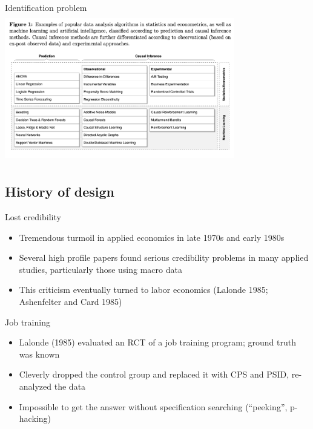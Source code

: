 \documentclass{beamer}
\begin{document}
\begin{frame}{Identification problem}
  \centering
  \includegraphics[scale=0.5,height=6.5cm, width=10cm]{./lecture_includes/prediction_causality.png}
\end{frame}



\subsection{History of design}



\begin{frame}{Lost credibility}

  \begin{itemize}
  \item Tremendous turmoil in applied economics in late 1970s and early 1980s
  \item Several high profile papers found serious credibility problems in many applied studies, particularly those using macro data
  \item This criticism eventually turned to labor economics (Lalonde 1985; Ashenfelter and Card 1985)
  \end{itemize}

\end{frame}


\begin{frame}{Job training}

\begin{itemize}
\item Lalonde (1985) evaluated an RCT of a job training program; ground truth was known
\item Cleverly dropped the control group and replaced it with CPS and PSID, re-analyzed the data
\item Impossible to get the answer without specification searching (``peeking'', p-hacking)

\end{itemize}

\end{frame}
\end{document}
